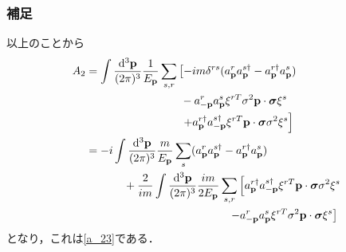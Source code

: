 \documentclass[pdflatex,unicode,ja=standard,12pt]{beamer}
\begin{document}
\begin{frame}[noframenumbering]
  
  \frametitle{補足\ \subsecname}
  \thispagestyle{empty}

  以上のことから
  \begin{align}
    A_2
    &=
    \int\frac{\dd^3\mathbf{p}}{(2\pi)^3}\frac{1}{E_{\mathbf{p}}}\sum_{s,r}
    \left[  
      -im\delta^{rs}
      (
        a_{\mathbf{p}}^ra_{\mathbf{p}}^{s\dag}
        -
        a_{\mathbf{p}}^{r\dag}a_{\mathbf{p}}^s
      )
    \right.
    \nonumber
    \\
    &\hspace{3cm}
    -
    a_{-\mathbf{p}}^ra_{\mathbf{p}}^s
    \xi^{rT}\sigma^2
    \mathbf{p}\cdot\bm{\sigma}
    \xi^s
    \nonumber
    \\
    &\hspace{3cm}
    \left.
      +
      a_{\mathbf{p}}^{r\dag}a_{-\mathbf{p}}^{s\dag}
      \xi^{rT}\mathbf{p}\cdot\bm{\sigma}\sigma^2\xi^s
    \right]
    \nonumber
    \\
    &=
    -i
    \int\frac{\dd^3\mathbf{p}}{(2\pi)^3}
    \frac{m}{E_{\mathbf{p}}}
    \sum_{s}
    (
      a_{\mathbf{p}}^ra_{\mathbf{p}}^{s\dag}
      -
      a_{\mathbf{p}}^{r\dag}a_{\mathbf{p}}^s
    )
    \nonumber
    \\
    &\hspace{1.2cm}
    +
    \frac{2}{im}
    \int\frac{\dd^3\mathbf{p}}{(2\pi)^3}
    \frac{im}{2E_{\mathbf{p}}}
    \sum_{s,r}
    \left[  
      a_{\mathbf{p}}^{r\dag}a_{-\mathbf{p}}^{s\dag}
      \xi^{rT}\mathbf{p}\cdot\bm{\sigma}\sigma^2\xi^s
    \right.
    \nonumber
    \\
    &\hspace{4.5cm}
    \left.
      -
      a_{-\mathbf{p}}^ra_{\mathbf{p}}^s
      \xi^{rT}\sigma^2
      \mathbf{p}\cdot\bm{\sigma}
    \xi^s
    \right]
  \end{align}
  となり，これは\eqref{a_23}である．

\end{frame}
\end{document}
